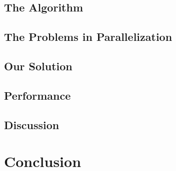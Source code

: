 \documentclass[english,12pt]{article}
\begin{document}
\subsection{The Algorithm}


\subsection{The Problems in Parallelization}


\subsection{Our Solution}


\subsection{Performance}


\subsection{Discussion}


\section{Conclusion}

% 
% 
\end{document}
